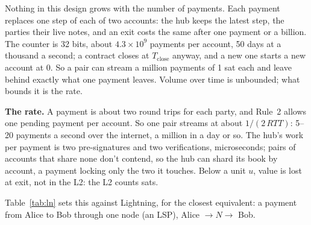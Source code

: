 \documentclass[11pt]{article}
\theoremstyle{plain}
\theoremstyle{definition}
\newcommand{\Tc}{T_{\mathrm{close}}}
\begin{document}
Nothing in this design grows with the number of payments. Each payment
replaces one step of each of two accounts: the hub keeps the latest
step, the parties their live notes, and an exit costs the same after
one payment or a billion. The counter is 32 bits, about $4.3 \times
10^9$ payments per account, 50 days at a thousand a second; a contract
closes at $\Tc$ anyway, and a new one starts a new account at 0. So a
pair can stream a million payments of 1 sat each and leave behind
exactly what one payment leaves. Volume over time is unbounded; what
bounds it is the rate.

\textbf{The rate.} A payment is about two round trips for each party,
and Rule~2 allows one pending payment per account. So one pair streams
at about $1/(2\,\mathit{RTT})$: 5--20 payments a second over the
internet, a million in a day or so. The hub's work per payment is two
pre-signatures and two verifications, microseconds; pairs of accounts
that share none don't contend, so the hub can shard its book by
account, a payment locking only the two it touches. Below a unit $u$,
value is lost at exit, not in the L2: the L2 counts sats.

Table~\ref{tab:ln} sets this against Lightning, for the closest
equivalent: a payment from Alice to Bob through one node (an LSP),
Alice $\to N \to$ Bob.
\end{document}
